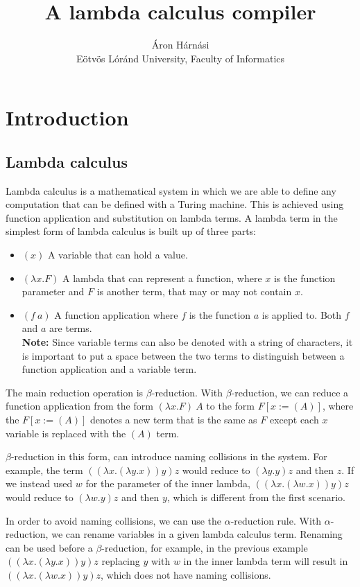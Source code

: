 \documentclass[12pt]{article}
\title{A lambda calculus compiler}
\author{Áron Hárnási \\ \normalsize Eötvös Lóránd University, Faculty of Informatics}
\begin{document}
\maketitle
\pagebreak
\tableofcontents
\pagebreak

\section{Introduction}
\subsection{Lambda calculus}

Lambda calculus is a mathematical system in which we are able to define any
computation that can be defined with a Turing machine. This is achieved using
function application and substitution on lambda terms. A lambda term in the
simplest form of lambda calculus is built up of three parts:
\begin{itemize}
    \item $(x)$ A variable that can hold a value.
    \item $(\lambda x. F)$ A lambda that can represent a function, where $x$
        is the function parameter and $F$ is another term, that may or 
        may not contain $x$.
    \item $(f\:a)$ A function application where $f$ is the function $a$ is
        applied to. Both $f$ and $a$ are terms. \\ \textbf{Note:} Since variable
        terms can also be denoted with a string of characters, it is important
        to put a space between the two terms to distinguish between a function
        application and a variable term.
\end{itemize}
The main reduction operation is $\beta$-reduction. With $\beta$-reduction, we
can reduce a function application from the form $(\lambda x. F)\:A$ to the
form $F[x := (A)]$, where the $F[x := (A)]$ denotes a new term that is the same
as $F$ except each $x$ variable is replaced with the $(A)$ term.

$\beta$-reduction in this form, can introduce naming collisions in the system.
For example, the term $((\lambda x. (\lambda y. x)) y) z$ would reduce to
$(\lambda y. y) z$ and then $z$. If we instead used $w$ for the parameter of the
inner lambda, $((\lambda x. (\lambda w. x)) y) z$ would reduce to $(\lambda w.
y) z$ and then $y$, which is different from the first scenario.

In order to avoid naming collisions, we can use the $\alpha$-reduction rule.
With $\alpha$-reduction, we can rename variables in a given lambda calculus
term. Renaming can be used before a $\beta$-reduction, for example, in the
previous example $((\lambda x. (\lambda y. x)) y) z$ replacing $y$ with $w$ in
the inner lambda term will result in $((\lambda x. (\lambda w. x)) y) z$, which
does not have naming collisions.
\end{document}
